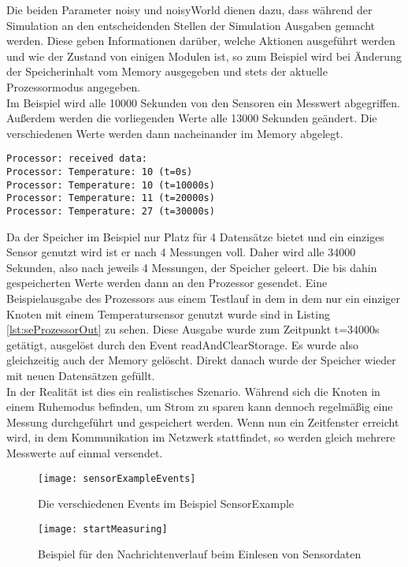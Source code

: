 Die beiden Parameter noisy und noisyWorld dienen dazu, dass während der Simulation an den entscheidenden Stellen der Simulation Ausgaben gemacht werden. Diese geben Informationen darüber, welche Aktionen ausgeführt werden und wie der Zustand von einigen Modulen ist, so zum Beispiel wird bei Änderung der Speicherinhalt vom Memory ausgegeben und stets der aktuelle Prozessormodus angegeben.\\
Im Beispiel wird alle 10000 Sekunden von den Sensoren ein Messwert abgegriffen. Außerdem werden die vorliegenden Werte alle 13000 Sekunden geändert. Die verschiedenen Werte werden dann nacheinander im Memory abgelegt.\\
\begin{lstlisting}[language=ned,caption={Ausgabe vom Prozessor bei t=40000s},label=lst:seProzessorOut]
Processor: received data:
Processor: Temperature: 10 (t=0s)
Processor: Temperature: 10 (t=10000s)
Processor: Temperature: 11 (t=20000s)
Processor: Temperature: 27 (t=30000s)
\end{lstlisting}
Da der Speicher im Beispiel nur Platz für 4 Datensätze bietet und ein einziges Sensor genutzt wird ist er nach 4 Messungen voll. Daher wird alle 34000 Sekunden, also nach jeweils 4 Messungen, der Speicher geleert. Die bis dahin gespeicherten Werte werden dann an den Prozessor gesendet. Eine Beispielausgabe des Prozessors aus einem Testlauf in dem in dem nur ein einziger Knoten mit einem Temperatursensor genutzt wurde sind in Listing \ref{lst:seProzessorOut} zu sehen. Diese Ausgabe wurde zum Zeitpunkt t=34000s getätigt, ausgelöst durch den Event readAndClearStorage. Es wurde also gleichzeitig auch der Memory gelöscht. Direkt danach wurde der Speicher wieder mit neuen Datensätzen gefüllt.\\
In der Realität ist dies ein realistisches Szenario. Während sich die Knoten in einem Ruhemodus befinden, um Strom zu sparen kann dennoch regelmäßig eine Messung durchgeführt und gespeichert werden. Wenn nun ein Zeitfenster erreicht wird, in dem Kommunikation im Netzwerk stattfindet, so werden gleich mehrere Messwerte auf einmal versendet.

\begin{figure}[htbp]
\centering
\caption{Die verschiedenen Events im Beispiel SensorExample}
\label{fig:seEvents}
\texttt{[image: sensorExampleEvents]}
\end{figure}

\begin{figure}[htbp]
\centering
\caption{Beispiel für den Nachrichtenverlauf beim Einlesen von Sensordaten}
\label{fig:seStartMeasuring}
\texttt{[image: startMeasuring]}
\end{figure}

